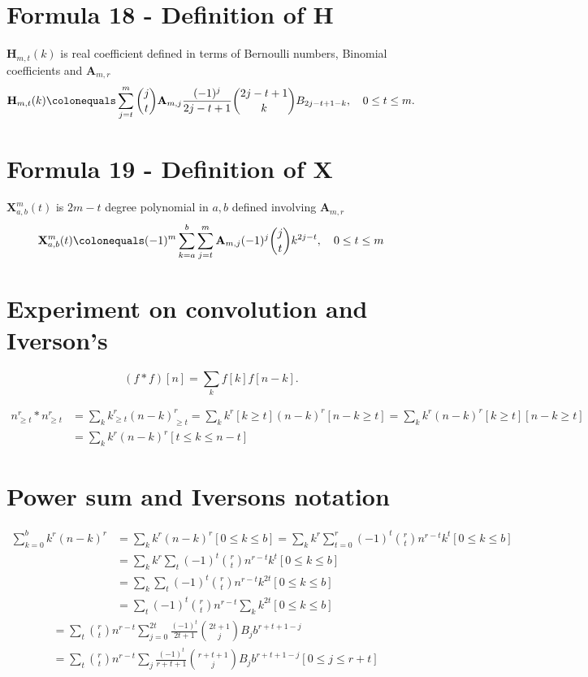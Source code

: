 \documentclass[12pt, letterpaper]{amsart}
\theoremstyle{definition}
\theoremstyle{remark}
\numberwithin{equation}{section}
\begin{document}
\section{Formula 18 - Definition of H}
$\mathbf{H}_{m,t}(k)$ is real coefficient defined in terms of Bernoulli numbers, Binomial coefficients and $\mathbf{A}_{m,r}$
\begin{equation}
\mathbf{H}_{m,t}(k)\colonequals \sum\limits_{j=t}^m \binom{j}{t}\mathbf{A}_{m,j} \frac{(-1)^j}{2j-t+1}\binom{2j-t+1}{k}B_{2j-t+1-k}, \quad 0\leq t \leq m.
\end{equation}
\section{Formula 19 - Definition of X}
$\mathbf{X}^{m}_{a,b}(t)$ is $2m-t$ degree polynomial in $a,b$ defined involving $\mathbf{A}_{m,r}$
\begin{equation}
\mathbf{X}^{m}_{a,b}(t)\colonequals (-1)^m \sum\limits_{k=a}^b\sum\limits_{j=t}^m \mathbf{A}_{m,j} (-1)^j \binom{j}{t} k^{2j-t}, \quad 0\leq t \leq m
\end{equation}
\section{Experiment on convolution and Iverson's}
\begin{equation*}
(f\ast f)[n]=\sum_{k}f[k]f[n-k].
\end{equation*}

\begin{equation*}
\begin{split}
n_{\geq t}^r \ast n_{\geq t}^r
&= \sum_{k}k_{\geq t}^r(n-k)_{\geq t}^r = \sum_{k}k^r[k\geq t](n-k)^r[n-k\geq t] = \sum_{k}k^r(n-k)^r[k\geq t][n-k\geq t] \\
&= \sum_{k}k^r(n-k)^r[t\leq k \leq n-t]
\end{split}
\end{equation*}
\section{Power sum and Iversons notation}
\begin{equation*}
\begin{split}
\sum_{k=0}^{b} k^r(n-k)^r
&= \sum_{k} k^r(n-k)^r [0\leq k \leq b] = \sum_{k} k^r \sum_{t=0}^{r}(-1)^t \binom{r}{t} n^{r-t}k^t [0\leq k \leq b] \\
&= \sum_{k} k^r \sum_{t}(-1)^t \binom{r}{t} n^{r-t}k^t [0\leq k \leq b] \\
&= \sum_{k}\sum_{t}(-1)^t \binom{r}{t} n^{r-t}k^{2t} [0\leq k \leq b] \\
&= \sum_{t}(-1)^t \binom{r}{t} n^{r-t}\sum_{k}k^{2t} [0\leq k \leq b]
\end{split}
\end{equation*}
\begin{equation*}
\begin{split}
&= \sum_{t}\binom{r}{t} n^{r-t}\sum_{j=0}^{2t}\frac{(-1)^t}{2t+1} \binom{2t+1}{j} B_j b^{r+t+1-j} \\
&= \sum_{t} \binom{r}{t} n^{r-t}\sum_{j}\frac{(-1)^t}{r+t+1} \binom{r+t+1}{j} B_j b^{r+t+1-j} [0\leq j\leq r+t]
\end{split}
\end{equation*}
\end{document}

